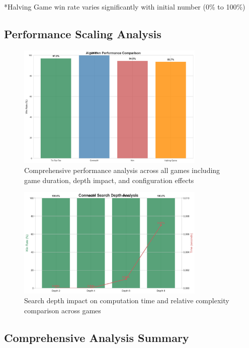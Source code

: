 \documentclass[12pt]{article}
\begin{document}
*Halving Game win rate varies significantly with initial number (0\% to 100\%)

\subsection{Performance Scaling Analysis}

\begin{figure}[H]
\centering
\includegraphics[width=0.8\textwidth]{output/images/performance_analysis.png}
\caption{Comprehensive performance analysis across all games including game duration, depth impact, and configuration effects}
\label{fig:performance_analysis}
\end{figure}

\begin{figure}[H]
\centering
\includegraphics[width=0.8\textwidth]{output/images/search_depth_analysis.png}
\caption{Search depth impact on computation time and relative complexity comparison across games}
\label{fig:search_depth}
\end{figure}

\subsection{Comprehensive Analysis Summary}
\end{document}
